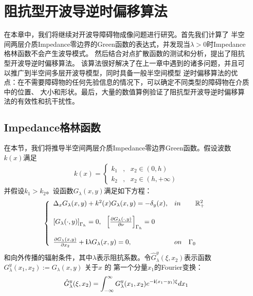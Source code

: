 
\chapter{阻抗型开波导逆时偏移算法}

在本章中，我们将继续对开波导障碍物成像问题进行研究。首先我们计算了
半空间两层介质Impedance零边界的Green函数的表达式，并发现当$\lambda>0$时Impedance格林函数不会产生波导模式。
然后结合对点扩散函数的测试和分析，提出了阻抗型开波导逆时偏移算法。
该算法很好解决了在上一章中遇到的诸多问题，并且可以推广到半空间多层开波导模型，同时具备一般半空间模型
逆时偏移算法\cite{ch_ha}的优点：在不需要障碍物的任何先验信息的情况下，可以确定不同类型的障碍物在介质中的位置、
大小和形状。最后，大量的数值算例验证了阻抗型开波导逆时偏移算法的有效性和抗干扰性。


\section{Impedance格林函数}
在本节，我们将推导半空间两层介质Impedance零边界Green函数。假设波数$k(x)$满足
\begin{eqnarray}\label{owg_wn}
k(x)=\left\{
\begin{array}{lll}
  k_1&,&x_2\in(0,h)\\
  k_2&,&x_2\in(h,+\infty)
\end{array}
\right.
\end{eqnarray}
并假设$k_1>k_2$。设函数$G_{\lambda}(x,y)$满足如下方程：
\begin{eqnarray}\label{G_Impedance}
\left\{
\begin{array}{lll}
  \Delta_xG_{\lambda}(x,y)+k^2(x)G_{\lambda}(x,y)=-\delta_y(x),&in&\quad \R^2_+\\
  & &\\
  \left[G_{\lambda}(\cdot,y)\right]_{\Gamma_h}=0,\ \ \left[\frac{\partial G_{\lambda}(\cdot,y)}{\partial\nu}\right]_{\Gamma_h}=0 & &\\
  & &\\
  \frac{\partial G_{\lambda}(x,y)}{\partial x_2}+\i\lambda G_{\lambda}(x,y)=0, &on&\Gamma_0\\
\end{array}
\right.
\end{eqnarray}
和向外传播的辐射条件，其中$\lambda$表示阻抗系数。令$\hat{G}^y_{\lambda}(\xi,x_2)$表示函数$G_{\lambda}^y(x_1,x_2):=G_{\lambda}(x,y)$ 关于$x$ 的
第一个分量$x_1$的Fourier变换：
\begin{equation*}
 \hat{G}^y_{\lambda}(\xi,x_2)=\int^{\infty}_{-\infty}G^y_{\lambda}(x_1,x_2)e^{-\mathbf{i}(x_1-y_1)\xi}dx_1
\end{equation*}
